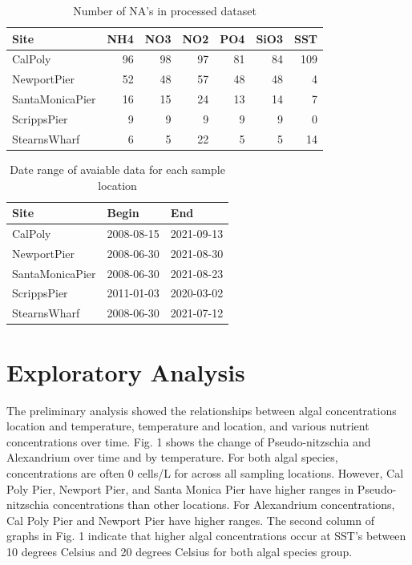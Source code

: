 \documentclass[
  12pt,
]{article}
\begin{document}
\begin{longtable}[t]{lrrrrrr}
\caption{\label{tab:prelim data analysis}Number of NA's in processed dataset}\\
\toprule
Site & NH4 & NO3 & NO2 & PO4 & SiO3 & SST\\
\midrule
CalPoly & 96 & 98 & 97 & 81 & 84 & 109\\
NewportPier & 52 & 48 & 57 & 48 & 48 & 4\\
SantaMonicaPier & 16 & 15 & 24 & 13 & 14 & 7\\
ScrippsPier & 9 & 9 & 9 & 9 & 9 & 0\\
StearnsWharf & 6 & 5 & 22 & 5 & 5 & 14\\
\bottomrule
\end{longtable}

\begin{longtable}[t]{lll}
\caption{\label{tab:prelim data analysis}Date range of avaiable data for each sample location}\\
\toprule
Site & Begin & End\\
\midrule
CalPoly & 2008-08-15 & 2021-09-13\\
NewportPier & 2008-06-30 & 2021-08-30\\
SantaMonicaPier & 2008-06-30 & 2021-08-23\\
ScrippsPier & 2011-01-03 & 2020-03-02\\
StearnsWharf & 2008-06-30 & 2021-07-12\\
\bottomrule
\end{longtable}

\newpage

\hypertarget{exploratory-analysis}{%
\section{Exploratory Analysis}\label{exploratory-analysis}}

The preliminary analysis showed the relationships between algal
concentrations location and temperature, temperature and location, and
various nutrient concentrations over time. Fig. 1 shows the change of
Pseudo-nitzschia and Alexandrium over time and by temperature. For both
algal species, concentrations are often 0 cells/L for across all
sampling locations. However, Cal Poly Pier, Newport Pier, and Santa
Monica Pier have higher ranges in Pseudo-nitzschia concentrations than
other locations. For Alexandrium concentrations, Cal Poly Pier and
Newport Pier have higher ranges. The second column of graphs in Fig. 1
indicate that higher algal concentrations occur at SST's between 10
degrees Celsius and 20 degrees Celsius for both algal species group.
\end{document}
